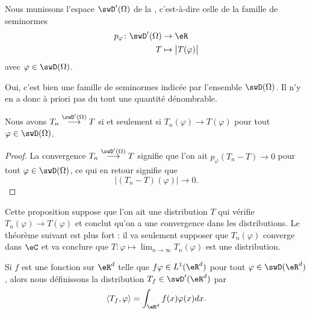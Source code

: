\begin{definition}        \label{DefASmjVaT}
	Nous munissons l'espace \( \swD'(\Omega)\) de la , c'est-à-dire celle de la famille de seminormes
	\begin{equation}
		\begin{aligned}
			p_{\varphi}\colon \swD'(\Omega) & \to \eR                        \\
			T                               & \mapsto \big| T(\varphi) \big|
		\end{aligned}
	\end{equation}
	avec \( \varphi\in\swD(\Omega)\).
\end{definition}
Oui, c'est bien une famille de seminormes indicée par l'ensemble \( \swD(\Omega)\). Il n'y en a donc à priori pas du tout une quantité dénombrable.

\begin{proposition}  \label{PropEUIsNhD}
	Nous avons \( T_n\stackrel{\swD'(\Omega)}{\longrightarrow}T\) si et seulement si \( T_n(\varphi)\to T(\varphi)\) pour tout \( \varphi\in\swD(\Omega)\).
\end{proposition}

\begin{proof}
	La convergence \( T_n\stackrel{\swD'(\Omega)}{\longrightarrow}T\) signifie que l'on ait \( p_{\varphi}(T_n-T)\to 0\) pour tout \( \varphi\in\swD(\Omega)\), ce qui en retour signifie que
	\begin{equation}
		\big| (T_n-T)(\varphi) \big|\to 0.
	\end{equation}
\end{proof}
Cette proposition suppose que l'on ait une distribution \( T\) qui vérifie \( T_n(\varphi)\to T(\varphi)\) et conclut qu'on a une convergence dans les distributions. Le théorème suivant est plus fort : il va seulement supposer que \( T_n(\varphi)\) converge dans \( \eC\) et va conclure que \( T\colon \varphi\mapsto \lim_{n\to \infty} T_n(\varphi)\) est une distribution.


\begin{definition}
	Si \( f\) est une fonction sur \( \eR^d\) telle que \( f\varphi\in L^1(\eR^d)\) pour tout \( \varphi\in \swD(\eR^d)\), alors nous définissons la distribution \( T_f\in\swD'(\eR^d)\) par
	\begin{equation}
		\langle T_f, \varphi\rangle =\int_{\eR^d}f(x)\varphi(x)dx.
	\end{equation}
\end{definition}

